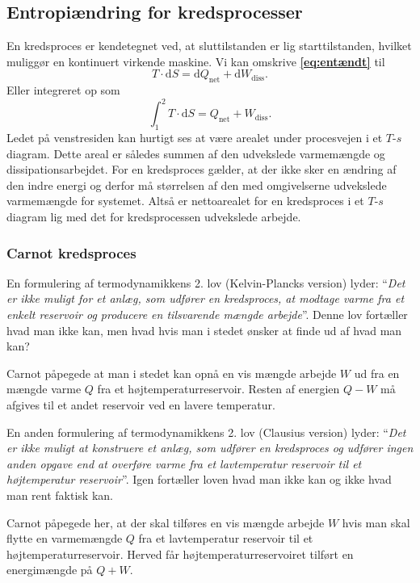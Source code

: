 \subsection{Entropiændring for kredsprocesser}
En kredsproces er kendetegnet ved, at sluttilstanden er lig starttilstanden, hvilket muliggør en kontinuert virkende maskine. Vi kan omskrive \textbf{\autoref{eq:entændt}} til
\[ 
T \cdot \mathrm{d}S = \mathrm{d}Q_{\mathrm{net}} + \mathrm{d}W_{\mathrm{diss}}
.\]
Eller integreret op som
\[ 
\int_{1}^{2} T \cdot \mathrm{d}S = Q_{\mathrm{net}} + W_{\mathrm{diss}}
.\]
Ledet på venstresiden kan hurtigt ses at være arealet under procesvejen i et $T$-$s$ diagram. Dette areal er således summen af den udvekslede varmemængde og dissipationsarbejdet. For en kredsproces gælder, at der ikke sker en ændring af den indre energi og derfor må størrelsen af den med omgivelserne udvekslede varmemængde for systemet. Altså er nettoarealet for en kredsproces i et $T$-$s$ diagram lig med det for kredsprocessen udvekslede arbejde. 

\subsubsection{Carnot kredsproces} \label{afs:Carnot}
En formulering af termodynamikkens 2. lov (Kelvin-Plancks version) lyder: ``\textit{Det er ikke muligt for et anlæg, som udfører en kredsproces, at modtage varme fra et enkelt reservoir og producere en tilsvarende mængde arbejde}''. Denne lov fortæller hvad man ikke kan, men hvad hvis man i stedet ønsker at finde ud af hvad man kan?

Carnot påpegede at man i stedet kan opnå en vis mængde arbejde $W$ ud fra en mængde varme $Q$ fra et højtemperaturreservoir. Resten af energien $Q-W$ må afgives til et andet reservoir ved en lavere temperatur.

En anden formulering af termodynamikkens 2. lov (Clausius version) lyder: ``\textit{Det er ikke muligt at konstruere et anlæg, som udfører en kredsproces og udfører ingen anden opgave end at overføre varme fra et lavtemperatur reservoir til et højtemperatur reservoir}''. Igen fortæller loven hvad man ikke kan og ikke hvad man rent faktisk kan.

Carnot påpegede her, at der skal tilføres en vis mængde arbejde $W$ hvis man skal flytte en varmemængde $Q$ fra et lavtemperatur reservoir til et højtemperaturreservoir. Herved får højtemperaturreservoiret tilført en energimængde på $Q + W$. 

